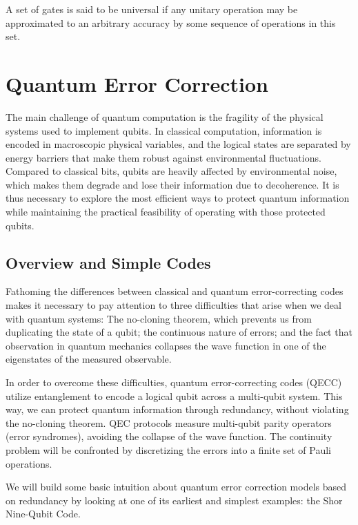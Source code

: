 \documentclass[12pt, twoside, openany]{book}
\begin{document}
A set of gates is said to be universal if any unitary operation may be approximated to an arbitrary accuracy by some sequence of operations in this set.

\chapter{Quantum Error Correction} \label{ch:QEC}

The main challenge of quantum computation is the fragility of the physical systems used to implement qubits. In classical computation, information is encoded in macroscopic physical variables, and the logical states are separated by energy barriers that make them robust against environmental fluctuations. Compared to classical bits, qubits are heavily affected by environmental noise, which makes them degrade and lose their information due to decoherence. It is thus necessary to explore the most efficient ways to protect quantum information while maintaining the practical feasibility of operating with those protected qubits. \cite{NielsenChuang2010} 

\section{Overview and Simple Codes}
\label{OverviewQEC}

Fathoming the differences between classical and quantum error-correcting codes makes it necessary to pay attention to three difficulties that arise when we deal with quantum systems: The no-cloning theorem, which prevents us from duplicating the state of a qubit; the continuous nature of errors; and the fact that observation in quantum mechanics collapses the wave function in one of the eigenstates of the measured observable. 

In order to overcome these difficulties, quantum error-correcting codes (QECC) utilize entanglement to encode a logical qubit across a multi-qubit system. This way, we can protect quantum information through redundancy, without violating the no-cloning theorem. QEC protocols measure multi-qubit parity operators (error syndromes), avoiding the collapse of the wave function. The continuity problem will be confronted by discretizing the errors into a finite set of Pauli operations.

We will build some basic intuition about quantum error correction models based on redundancy by looking at one of its earliest and simplest examples: the Shor Nine-Qubit Code. 
\end{document}
